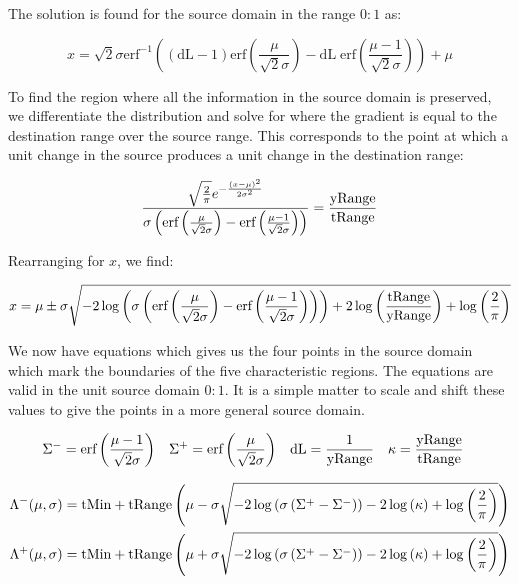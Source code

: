 The solution is found for the source domain in the range $0:1$ as:


\begin{equation}\label{eq:LowHigh}
 x = \sqrt{2} \sigma  \text{erf}^{-1}\left((\text{dL}-1) \text{erf}\left(\frac{\mu }{\sqrt{2} \sigma }\right)-\text{dL} \; \text{erf}\left(\frac{\mu -1}{\sqrt{2} \sigma }\right)\right)+\mu
\end{equation}

To find the region where all the information in the source domain is preserved, we differentiate the distribution and solve for where the gradient is equal to the destination range over the source range. This corresponds to the point at which a unit change in the source produces a unit change in the destination range:

\begin{equation}\label{eq:Boundaries}
\frac{\sqrt{\frac{2}{\pi }} e^{-\frac{(x-\mu )^2}{2 \sigma ^2}}}{\sigma  \left(\text{erf}\left(\frac{\mu }{\sqrt{2} \sigma }\right)-\text{erf}\left(\frac{\mu -1}{\sqrt{2} \sigma }\right)\right)}=\frac{\text{yRange}}{\text{tRange}}
\end{equation}

Rearranging for $x$, we find:

\begin{equation}\label{eq:PreservedRegion}
 x=\mu \pm \sigma  \sqrt{-2 \log \left(\sigma  \left(\text{erf}\left(\frac{\mu }{\sqrt{2} \sigma }\right)-\text{erf}\left(\frac{\mu -1}{\sqrt{2} \sigma }\right)\right)\right)+2 \log \left(\frac{\text{tRange}}{\text{yRange}}\right)+\log \left(\frac{2}{\pi }\right)}
\end{equation}

We now have equations which gives us the four points in the source domain which mark the boundaries of the five characteristic regions. The equations are valid in the unit source domain $0:1$. It is a simple matter to scale and shift these values to give the points in a more general source domain.


\begin{equation}
\begin{aligned}
\Sigma^- &= \text{erf}\left(\frac{\mu -1}{\sqrt{2} \sigma }\right) &
 \Sigma^+ &= \text{erf}\left(\frac{\mu }{\sqrt{2} \sigma }\right) &
  \text{dL} &= \frac{1}{\text{yRange}} &
  \kappa &= \frac{\text{yRange}}{\text{tRange}} 
\end{aligned}
\end{equation}

\begin{equation}\label{eq:PreservedRegionGen}
\begin{aligned}
\Lambda^-(\mu,\sigma) &= \text{tMin} + \text{tRange}\left( \mu - \sigma  \sqrt{-2 \log \left(\sigma  \left(\Sigma^+-\Sigma^-\right)\right) - 2 \log \left(\kappa\right)+\log \left(\frac{2}{\pi }\right)}\right) \\
\Lambda^+(\mu,\sigma) &= \text{tMin} + \text{tRange} \left(\mu + \sigma  \sqrt{-2 \log \left(\sigma  \left(\Sigma^+-\Sigma^-\right)\right)-2 \log \left(\kappa\right)+\log \left(\frac{2}{\pi }\right)}\right)
\end{aligned}
\end{equation}

